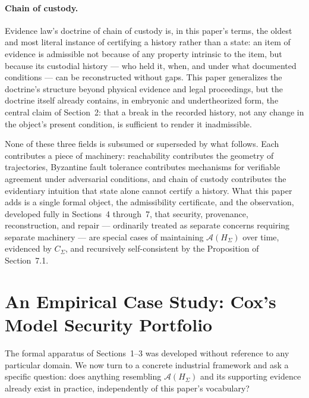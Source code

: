 \documentclass[11pt]{article}
\begin{document}
\paragraph{Chain of custody.} Evidence law's doctrine of chain of custody is, in this paper's terms, the oldest and most literal instance of certifying a history rather than a state: an item of evidence is admissible not because of any property intrinsic to the item, but because its custodial history --- who held it, when, and under what documented conditions --- can be reconstructed without gaps. This paper generalizes the doctrine's structure beyond physical evidence and legal proceedings, but the doctrine itself already contains, in embryonic and undertheorized form, the central claim of Section~2: that a break in the recorded history, not any change in the object's present condition, is sufficient to render it inadmissible.

None of these three fields is subsumed or superseded by what follows. Each contributes a piece of machinery: reachability contributes the geometry of trajectories, Byzantine fault tolerance contributes mechanisms for verifiable agreement under adversarial conditions, and chain of custody contributes the evidentiary intuition that state alone cannot certify a history. What this paper adds is a single formal object, the admissibility certificate, and the observation, developed fully in Sections~4 through~7, that security, provenance, reconstruction, and repair --- ordinarily treated as separate concerns requiring separate machinery --- are special cases of maintaining $\mathcal{A}(H_\Sigma)$ over time, evidenced by $C_\Sigma$, and recursively self-consistent by the Proposition of Section~7.1.

\section{An Empirical Case Study: Cox's Model Security Portfolio}

The formal apparatus of Sections~1--3 was developed without reference to any particular domain. We now turn to a concrete industrial framework and ask a specific question: does anything resembling $\mathcal{A}(H_\Sigma)$ and its supporting evidence already exist in practice, independently of this paper's vocabulary?
\end{document}
